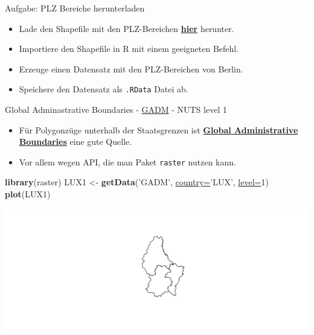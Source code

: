 \documentclass[ignorenonframetext,]{beamer}
\newenvironment{Shaded}{\begin{snugshade}}{\end{snugshade}}
\newcommand{\DataTypeTok}[1]{\textcolor[rgb]{0.74,0.68,0.62}{\underline{#1}}}
\newcommand{\DecValTok}[1]{\textcolor[rgb]{0.27,0.67,0.26}{#1}}
\newcommand{\KeywordTok}[1]{\textcolor[rgb]{0.26,0.66,0.93}{\textbf{#1}}}
\newcommand{\NormalTok}[1]{\textcolor[rgb]{0.74,0.68,0.62}{#1}}
\newcommand{\StringTok}[1]{\textcolor[rgb]{0.02,0.61,0.04}{#1}}
\providecommand{\tightlist}{%
  \setlength{\itemsep}{0pt}\setlength{\parskip}{0pt}}
\begin{document}
\begin{frame}[fragile]{Aufgabe: PLZ Bereiche herunterladen}
\protect\hypertarget{aufgabe-plz-bereiche-herunterladen}{}

\begin{itemize}
\tightlist
\item
  Lade den Shapefile mit den PLZ-Bereichen
  \href{http://arnulf.us/PLZ}{\textbf{hier}} herunter.
\item
  Importiere den Shapefile in R mit einem geeigneten Befehl.
\item
  Erzeuge einen Datensatz mit den PLZ-Bereichen von Berlin.
\item
  Speichere den Datensatz als \texttt{.RData} Datei ab.
\end{itemize}

\end{frame}

\begin{frame}[fragile]{Global Adminastrative Boundaries -
\href{http://www.gadm.org/}{GADM} - NUTS level 1}
\protect\hypertarget{global-adminastrative-boundaries---gadm---nuts-level-1}{}

\begin{itemize}
\tightlist
\item
  Für Polygonzüge unterhalb der Staatsgrenzen ist
  \href{http://www.gadm.org/}{\textbf{Global Administrative Boundaries}}
  eine gute Quelle.
\item
  Vor allem wegen API, die man Paket \texttt{raster} nutzen kann.
\end{itemize}

\begin{Shaded}
\begin{Highlighting}[]
\KeywordTok{library}\NormalTok{(raster)}
\NormalTok{LUX1 <-}\StringTok{ }\KeywordTok{getData}\NormalTok{(}\StringTok{'GADM'}\NormalTok{, }\DataTypeTok{country=}\StringTok{'LUX'}\NormalTok{, }\DataTypeTok{level=}\DecValTok{1}\NormalTok{)}
\KeywordTok{plot}\NormalTok{(LUX1)}
\end{Highlighting}
\end{Shaded}

\includegraphics{Geomedizin_files/figure-beamer/unnamed-chunk-126-1.pdf}

\end{frame}
\end{document}
